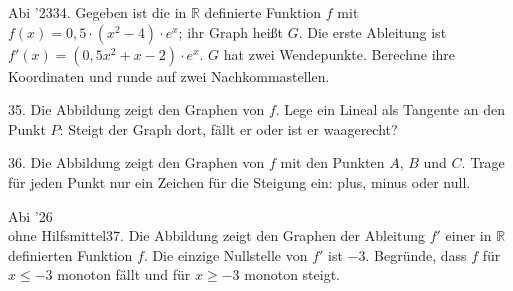 \documentclass[11pt]{article}
\begin{document}
\pfgruppe{}
\begin{pfaufg}{Abi ’23}{34.}{}
Gegeben ist die in $\mathbb{R}$ definierte Funktion $f$ mit $f(x) = 0{,}5\cdot(x^2 - 4)\cdot e^x$; ihr Graph heißt $G$. Die erste Ableitung ist $f'(x) = (0{,}5x^2 + x - 2)\cdot e^x$. $G$ hat zwei Wendepunkte. Berechne ihre Koordinaten und runde auf zwei Nachkommastellen.
\end{pfaufg}
\pfgruppe{}
\begin{pfaufg}{}{35.}{}
Die Abbildung zeigt den Graphen von $f$. Lege ein Lineal als Tangente an den Punkt $P$: Steigt der Graph dort, fällt er oder ist er waagerecht? 
\par\smallskip\noindent \begin{ksys}[xmin=-3,xmax=3,ymin=-3,ymax=3,ablesen]   \end{ksys}\par
{}
\end{pfaufg}
\begin{pfaufg}{}{36.}{}
Die Abbildung zeigt den Graphen von $f$ mit den Punkten $A$, $B$ und $C$. Trage für jeden Punkt nur ein Zeichen für die Steigung ein: plus, minus oder null.
\par\smallskip\noindent \begin{ksys}[xmin=-3,xmax=3,ymin=-3,ymax=3,ablesen]     \end{ksys}\par
{}
\end{pfaufg}
\pfgruppe{}
\begin{pfaufg}{Abi ’26\\ohne Hilfsmittel}{37.}{}
Die Abbildung zeigt den Graphen der Ableitung $f'$ einer in $\mathbb{R}$ definierten Funktion $f$. Die einzige Nullstelle von $f'$ ist $-3$. Begründe, dass $f$ für $x \le -3$ monoton fällt und für $x \ge -3$ monoton steigt.
\par\smallskip\noindent {}\par
{}
\end{pfaufg}
\end{document}
